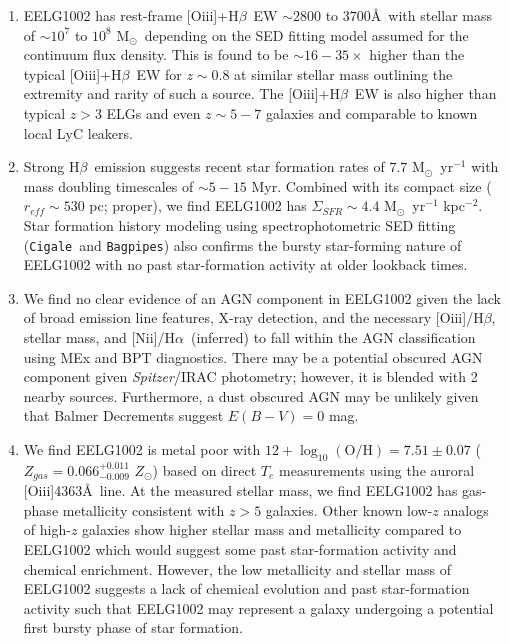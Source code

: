 \documentclass[twocolumn,tight,times,linenumbers]{aastex631}
\newcommand{\halpha}{H$\alpha$}
\newcommand{\hbeta}{H$\beta$}
\newcommand{\nii}{[N{\sc ii}]}
\newcommand{\oiii}{[O{\sc iii}]}
\newcommand{\msol}{M$_\odot$}
\newcommand{\zsol}{$Z_\odot$}
\newcommand{\cigale}{\texttt{Cigale}}
\newcommand{\bagpipes}{\texttt{Bagpipes}}
\begin{document}
		\begin{enumerate}[nolistsep,label=(\roman*)]
			\item EELG1002 has rest-frame \oiii+\hbeta~EW $\sim 2800$ to $3700$\AA~with stellar mass of $\sim 10^7$ to $10^8$ \msol~depending on the SED fitting model assumed for the continuum flux density. This is found to be $\sim 16 - 35 \times$ higher than the typical \oiii+\hbeta~EW for $z \sim 0.8$ at similar stellar mass outlining the extremity and rarity of such a source. The \oiii+\hbeta~EW is also higher than typical $z > 3$ ELGs  \citep{Khostovan2016,Boyett2024} and even $z \sim 5 - 7$ galaxies \citep{Matthee2023} and comparable to known local LyC leakers.
			
			\item Strong \hbeta~emission suggests recent star formation rates of $7.7$ \msol~yr$^{-1}$ with mass doubling timescales of $\sim 5 - 15$ Myr. Combined with its compact size ($r_{eff} \sim 530$ pc; proper), we find EELG1002 has $\Sigma_{SFR} \sim 4.4$ \msol~yr$^{-1}$ kpc$^{-2}$. Star formation history modeling using spectrophotometric SED fitting (\cigale~and \bagpipes) also confirms the bursty star-forming nature of EELG1002 with no past star-formation activity at older lookback times.
						
			\item We find no clear evidence of an AGN component in EELG1002 given the lack of broad emission line features, X-ray detection, and the necessary \oiii/\hbeta, stellar mass, and \nii/\halpha~(inferred) to fall within the AGN classification using MEx and BPT diagnostics. There may be a potential obscured AGN component given \textit{Spitzer}/IRAC photometry; however, it is blended with 2 nearby sources. Furthermore, a dust obscured AGN may be unlikely given that Balmer Decrements suggest $E(B-V) = 0$ mag.
			
			\item We find EELG1002 is metal poor with $12+\log_{10} (\textrm{O/H}) = 7.51\pm0.07$ ($Z_{gas} = 0.066^{+0.011}_{-0.009}$ \zsol) based on direct $T_e$ measurements using the auroral \oiii4363\AA~line. At the measured stellar mass, we find EELG1002 has gas-phase metallicity consistent with $z > 5$ galaxies. Other known low-$z$ analogs of high-$z$ galaxies show higher stellar mass and metallicity compared to EELG1002 which would suggest some past star-formation activity and chemical enrichment. However, the low metallicity and stellar mass of EELG1002 suggests a lack of chemical evolution and past star-formation activity such that EELG1002 may represent a galaxy undergoing a potential first bursty phase of star formation.
			

\end{enumerate}
\end{document}
